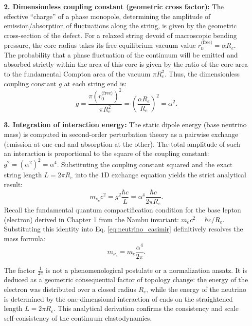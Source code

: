 \documentclass[11pt,a4paper]{article}
\begin{document}
\textbf{2. Dimensionless coupling constant (geometric cross factor):}
The effective ``charge'' of a phase monopole, determining the amplitude of emission/absorption of fluctuations along the string, is given by the geometric cross-section of the defect.
For a relaxed string devoid of macroscopic bending pressure, the core radius takes its free equilibrium vacuum value $r_0^{\text{(free)}} = \alpha R_e$.
The probability that a phase fluctuation of the continuum will be emitted and absorbed strictly within the area of this core is given by the ratio of the core area to the fundamental Compton area of the vacuum $\pi R_e^2$. Thus, the dimensionless coupling constant $g$ at each string end is:
\begin{equation}
g = \frac{\pi (r_0^{\text{(free)}})^2}{\pi R_e^2} = \left( \frac{\alpha R_e}{R_e} \right)^2 = \alpha^2.
\end{equation}

\textbf{3. Integration of interaction energy:}
The static dipole energy (base neutrino mass) is computed in second-order perturbation theory as a pairwise exchange (emission at one end and absorption at the other). The total amplitude of such an interaction is proportional to the square of the coupling constant: $g^2 = (\alpha^2)^2 = \alpha^4$.
Substituting the coupling constant squared and the exact string length $L = 2\pi R_e$ into the 1D exchange equation yields the strict analytical result:
\begin{equation}
m_{\nu_e} c^2 = g^2 \frac{\hbar c}{L} = \alpha^4 \frac{\hbar c}{2\pi R_e}.
\label{eq:neutrino_casimir}
\end{equation}
Recall the fundamental quantum compactification condition for the base lepton (electron) derived in Chapter 1 from the Nambu invariant: $m_e c^2 = \hbar c / R_e$. Substituting this identity into Eq. \eqref{eq:neutrino_casimir} definitively resolves the mass formula:
\begin{equation}
m_{\nu_e} = m_e \frac{\alpha^4}{2\pi}.
\end{equation}

The factor $\frac{1}{2\pi}$ is not a phenomenological postulate or a normalization ansatz. It is deduced as a geometric consequential factor of topology change: the energy of the electron was distributed over a closed radius $R_e$, while the energy of the neutrino is determined by the one-dimensional interaction of ends on the straightened length $L = 2\pi R_e$. This analytical derivation confirms the consistency and scale self-consistency of the continuum elastodynamics.
\end{document}
